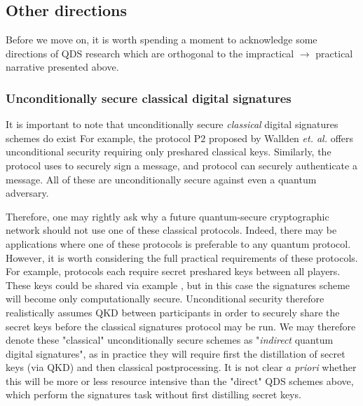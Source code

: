 \subsection{Other directions}


%
%

Before we move on, it is worth spending a moment to acknowledge some directions of QDS research which are orthogonal to the impractical $\rightarrow$ practical narrative presented above.


\subsubsection*{Unconditionally secure classical digital signatures}
It is important to note that unconditionally secure \emph{classical} digital signatures schemes do exist  For example, the protocol P$2$ proposed by Wallden \emph{et. al.} \cite{Wallden2015} offers unconditional security requiring only preshared classical keys. Similarly, the protocol \cite{Amiri2016a} uses  to securely sign a message, and protocol  can securely authenticate  a message. All of these are unconditionally secure against even a quantum adversary.

Therefore, one may rightly ask why a future quantum-secure cryptographic network should not use one of these classical protocols. Indeed, there may be applications where one of these protocols is preferable to any quantum protocol. However, it is worth considering the full practical requirements of these protocols. For example, protocols \cite{Wallden2015, Amiri2016a} each require secret preshared keys between all players. These keys could be shared via example , but in this case the signatures scheme will become only computationally secure. Unconditional security therefore realistically assumes QKD between participants in order to securely share the secret keys before the classical signatures protocol may be run. We may therefore denote these "classical" unconditionally secure schemes as "\emph{indirect} quantum digital signatures", as in practice they will require first the distillation of secret keys (via QKD) and then classical postprocessing. It is not clear \emph{a priori} whether this will be more or less resource intensive than the "direct" QDS schemes above, which perform the signatures task without first distilling secret keys.

